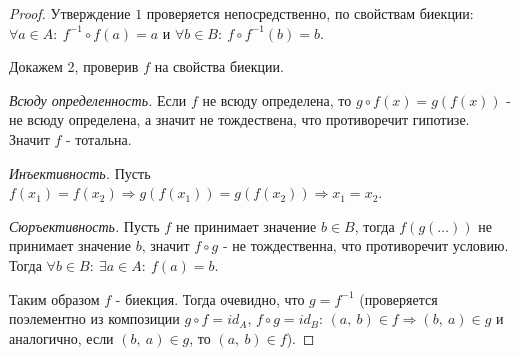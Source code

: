 \documentclass[a4paper,12pt]{article}
\begin{document}
        \begin{proof}
            Утверждение $1$ проверяется непосредственно, по свойствам биекции: $\forall a \in A:\ f^{-1} \circ f(a) = a$ и
                     $\forall b \in B:\ f \circ f^{-1}(b) = b$.

            Докажем 2, проверив $f$ на свойства биекции.

            \textit{Всюду определенность.}
            Если $f$ не всюду определена, то  $g \circ f(x) = g(f(x))$ - не всюду определена, а значит не тождествена, что противоречит гипотизе. Значит $f$ - тотальна.

            \textit{Инъективность.} 
            Пусть $f(x_1) = f(x_2) \Rightarrow g(f(x_1)) = g(f(x_2)) \Rightarrow x_1 = x_2$.

            \textit{Сюръективность.} 
            Пусть $f$ не принимает значение $b \in B$, тогда $f(g(\ldots))$ не принимает значение $b$, значит $f \circ g$ - не тождественна, что противоречит условию. Тогда $\forall b \in B:\ \exists a \in A:\ f(a) = b$.

            Таким образом $f$ - биекция. Тогда очевидно, что $g = f^{-1}$ (проверяется поэлементно из композиции $g \circ f = id_A$, $f \circ g = id_B$: $(a,\ b) \in f \Rightarrow (b,\ a) \in g$ и аналогично, если $(b,\ a) \in g$, то $(a,\ b) \in f$).
        \end{proof}
\end{document}
